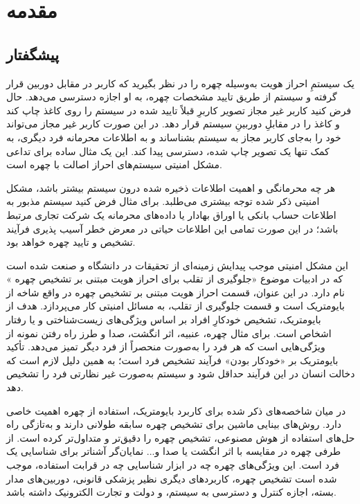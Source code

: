 
\chapter{مقدمه}
\thispagestyle{empty}
\section{پیشگفتار}
یک سیستمِ احراز هویت به‌وسیله چهره را در نظر بگیرید که کاربر در مقابل دوربین قرار گرفته و سیستم از طریق تایید مشخصات چهره، به او اجازه دسترسی می‌دهد. حال فرض کنید کاربر غیر مجاز تصویر کاربرِ قبلاً تایید شده در سیستم را روی کاغذ چاپ کند و کاغذ را در مقابلِ دوربینِ سیستم قرار دهد. در این صورت کاربر غیر مجاز می‌تواند خود را به‌جای کاربر مجاز به سیستم بشناساند و به اطلاعات محرمانه فرد دیگری، به کمک تنها یک تصویر چاپ شده، دسترسی پیدا کند. این یک مثال ساده برای تداعی مشکل امنیتی سیستم‌های احراز اصالت با چهره است.

هر چه محرمانگی و اهمیت اطلاعات ذخیره شده درون سیستم بیشتر باشد، مشکل امنیتی ذکر شده توجه بیشتری می‌طلبد. برای مثال فرض کنید سیستم مذبور به اطلاعات حساب بانکی یا اوراق بهادار یا داده‌های محرمانه یک شرکت تجاری مرتبط باشد؛ در این صورت تمامی این اطلاعات حیاتی در معرض خطر آسیب پذیری فرآیند تشخیص و تایید چهره خواهد بود.

این مشکل امنیتی موجب پیدایش زمینه‌ای از تحقیقات در دانشگاه و صنعت شده است که در ادبیات موضوع «جلوگیری از تقلب برای احراز هویت مبتنی بر تشخیص چهره
» نام دارد. در این عنوان، قسمت احراز هویت مبتنی بر تشخیص چهره در واقع شاخه از بایومتریک
   است و قسمت جلوگیری از تقلب، به مسائل امنیتی کار می‌پردازد.
هدف از بایومتریک، تشخیص خودکارِ افراد بر اساس ویژگی‌های زیست‌شناختی و یا رفتار اشخاص است. برای مثال چهره، عنبیه، اثر انگشت، صدا و طرز راه رفتن نمونه از ویژگی‌هایی است که هر فرد را به‌صورت منحصراً از فرد دیگر تمیز می‌دهد.  تأکید بایومتریک بر «خودکار بودن» فرآیند تشخیص فرد است؛ به همین دلیل لازم است که دخالت انسان در این فرآیند حداقل شود و سیستم به‌صورت غیر نظارتی
 فرد را تشخیص دهد.
 
در میان شاخصه‌های ذکر شده برای کاربرد بایومتریک، استفاده از چهره اهمیت خاصی دارد. روش‌های بینایی ماشین برای تشخیص چهره سابقه طولانی دارند و به‌تازگی راه حل‌های استفاده از هوش مصنوعی، تشخیص چهره را دقیق‌تر و متداول‌تر کرده است. از طرفی چهره در مقایسه با اثر انگشت یا صدا و... نمایان‌گر آشناتر برای شناسایی یک فرد است. این ویژگی‌های چهره چه در ابزار شناسایی چه در قرابت استفاده، موجب شده است تشخیص چهره، کاربردهای دیگری نظیر پزشکی قانونی، دوربین‌های مدار بسته، اجازه کنترل و دسترسی به سیستم، و دولت و تجارت الکترونیک داشته باشد.

